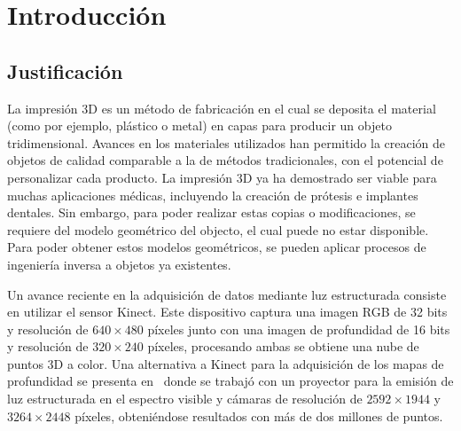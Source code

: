 \chapter{Introducción}

	\section{Justificación}
	La impresión 3D es un método de fabricación en el cual se deposita el material (como por ejemplo, plástico o metal) en capas para producir un objeto tridimensional.
	Avances en los materiales utilizados han permitido la creación de objetos de calidad comparable a la de métodos tradicionales, con el potencial de personalizar cada producto.
	La impresión 3D ya ha demostrado ser viable para muchas aplicaciones médicas, incluyendo la creación de prótesis e implantes dentales\cite{Schubert159}. %
	Sin embargo, para poder realizar estas copias o modificaciones,
	se requiere del modelo geométrico del objecto, el cual puede no estar disponible.
	Para poder obtener estos modelos geométricos,
	se pueden aplicar procesos de ingeniería inversa a objetos ya existentes.


	Un avance reciente en la adquisición de datos mediante luz estructurada consiste en utilizar el sensor Kinect.
	Este dispositivo captura una imagen RGB de 32 bits y resolución de $640 \times 480$ píxeles
	junto con una imagen de profundidad de 16 bits y resolución de $320 \times 240$ píxeles\cite{MatheEstudioKinect}, %
	procesando ambas se obtiene una nube de puntos 3D a color. %
	Una alternativa a Kinect para la adquisición de los mapas de profundidad se presenta en~\cite{Pancho}
	donde se trabajó con un proyector para la emisión de luz estructurada en el espectro visible y cámaras de resolución de $2592 \times 1944$ y $3264 \times 2448$ píxeles,
	obteniéndose resultados con más de dos millones de puntos.

